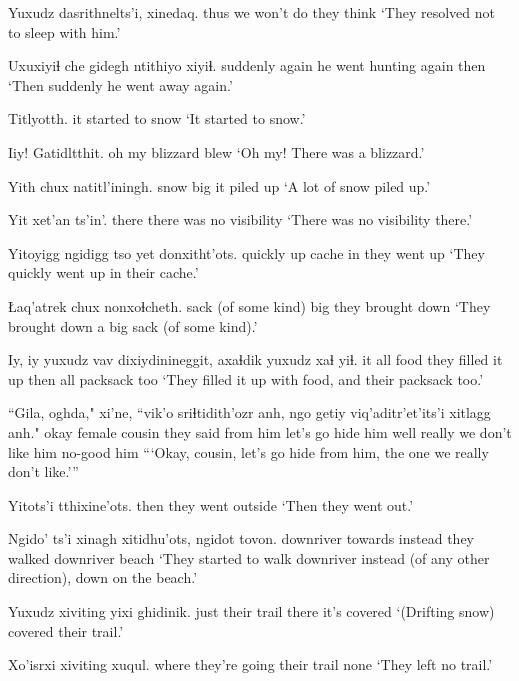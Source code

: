 \documentclass[12pt]{article}
\begin{document}
\gll Yuxudz dasrithnelts'i, xinedaq.
thus   {we won't do} {they think}
\glt `They resolved not to sleep with him.'
\glend

\gll Uxuxiyiɬ che   {gidegh ntithiyo}     xiyiɬ.
suddenly again  {he went hunting again} then
\glt `Then suddenly he went away again.'
\glend

\gll Titlyotth.
{{it started to snow}}
\glt `It started to snow.'
\glend

\gll Iiy! Gatidltthit.
{{oh my}} {{blizzard blew}}
\glt `Oh my! There was a blizzard.'
\glend

\gll Yith chux natitl'iningh.
snow big  {it piled up}
\glt `A lot of snow piled up.'
\glend

\gll Yit   {xet'an ts'in'.} 
there {there was no visibility}
\glt `There was no visibility there.'
\glend

\gll Yitoyigg ngidigg tso   yet donxitht'ots.
quickly  up      cache in  {they went up}
\glt `They quickly went up in their cache.'
\glend

\gll Łaq'atrek chux nonxoɬcheth.
{sack (of some kind)} big  {they brought down}
\glt `They brought down a big sack (of some kind).'
\glend

\gll Iy, iy yuxudz vav  dixiydinineggit, axaɬdik yuxudz xaɬ      yiɬ.
it {}    all    food {they filled it up  } then    all    packsack too
\glt `They filled it up with food, and their packsack too.'
\glend

\gll ``Gila, oghda," xi'ne,    ``vik'o    sriɬtidith'ozr anh, ngo  getiy  viq'aditr'et'its'i xitlagg anh."
okay   {female cousin}  {they said}  {from him} {let's go hide}  him    well really {we don't like him}  no-good him
\glt ```Okay, cousin, let's go hide from him, the one we really don't like.'''
\glend

\gll Yitots'i tthixine'ots.
then     {they went outside} 
\glt `Then they went out.'
\glend

\gll Ngido' ts'i    xinagh  xitidhu'ots, ngidot    tovon.
 downriver towards instead {they walked} downriver beach
\glt `They started to walk downriver instead (of any other direction), down on the beach.'
\glend

\gll Yuxudz xiviting    yixi ghidinik. 
just   {their trail} there {it's covered}
\glt `(Drifting snow) covered their trail.'
\glend

\gll Xo'isrxi      xiviting    xuqul. 
{where they're going} {their trail} none
\glt `They left no trail.'
\glend
\end{document}
